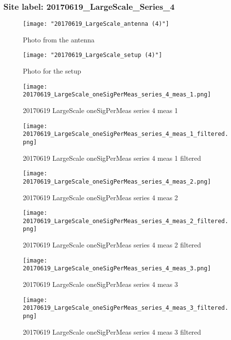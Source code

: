 \subsubsection{Site label: 20170619\_LargeScale\_Series\_4}
\begin{figure}[ht] \caption{Photo from the antenna}
\texttt{[image: "20170619\_LargeScale\_antenna (4)"]}\centering\end{figure}
\begin{figure}[ht] \caption{Photo for the setup}
\texttt{[image: "20170619\_LargeScale\_setup (4)"]}\centering\end{figure}
\begin{figure}[ht] \caption{20170619 LargeScale oneSigPerMeas series 4 meas 1}
\texttt{[image: 20170619\_LargeScale\_oneSigPerMeas\_series\_4\_meas\_1.png]}\centering\end{figure}
\begin{figure}[ht] \caption{20170619 LargeScale oneSigPerMeas series 4 meas 1 filtered}
\texttt{[image: 20170619\_LargeScale\_oneSigPerMeas\_series\_4\_meas\_1\_filtered.png]}\centering\end{figure}
\begin{figure}[ht] \caption{20170619 LargeScale oneSigPerMeas series 4 meas 2}
\texttt{[image: 20170619\_LargeScale\_oneSigPerMeas\_series\_4\_meas\_2.png]}\centering\end{figure}
\begin{figure}[ht] \caption{20170619 LargeScale oneSigPerMeas series 4 meas 2 filtered}
\texttt{[image: 20170619\_LargeScale\_oneSigPerMeas\_series\_4\_meas\_2\_filtered.png]}\centering\end{figure}
\begin{figure}[ht] \caption{20170619 LargeScale oneSigPerMeas series 4 meas 3}
\texttt{[image: 20170619\_LargeScale\_oneSigPerMeas\_series\_4\_meas\_3.png]}\centering\end{figure}
\begin{figure}[ht] \caption{20170619 LargeScale oneSigPerMeas series 4 meas 3 filtered}
\texttt{[image: 20170619\_LargeScale\_oneSigPerMeas\_series\_4\_meas\_3\_filtered.png]}\centering\end{figure}
\clearpage
